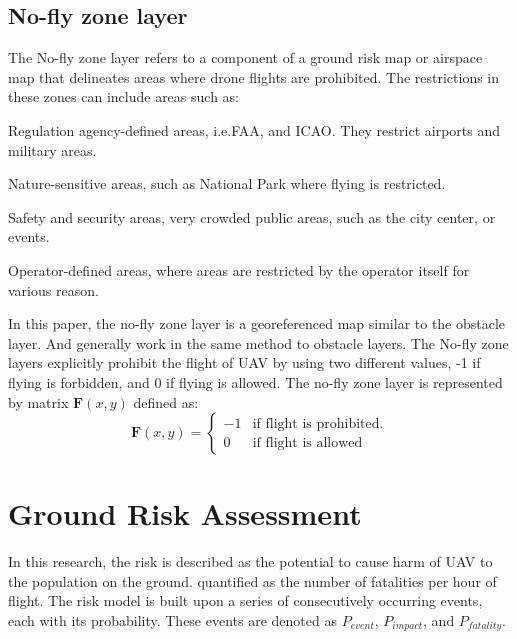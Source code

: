 \documentclass[12pt]{report}
\begin{document}
        \subsection{No-fly zone layer}
            The No-fly zone layer refers to a component of a ground risk map or airspace map that delineates areas where
            drone flights are prohibited. The restrictions in these zones can include areas such as:
            \begin{myitemize}
                \item Regulation agency-defined areas, i.e.\ac{FAA}, and \ac{ICAO}. They restrict airports and military areas.
                \item Nature-sensitive areas, such as National Park where flying is restricted.
                \item Safety and security areas, very crowded public areas, such as the city center, or events.
                \item Operator-defined areas, where areas are restricted by the operator itself for various reason. 
            \end{myitemize}

            In this paper, the no-fly zone layer is a georeferenced map similar to the obstacle layer. And generally
            work in the same method to obstacle layers. The No-fly zone layers explicitly prohibit the flight of UAV by
            using two different values, -1 if flying is forbidden, and 0 if flying is allowed. The no-fly zone layer is
            represented by matrix \(\mathbf{F}(x, y)\) defined as:
            \begin{equation}
                \mathbf{F}(x, y) = 
                \begin{cases}    
                    -1 & \text{if flight is prohibited.} \\
                    0 & \text{if flight is allowed}
                \end{cases}
            \end{equation}

    \section{Ground Risk Assessment}
        In this research, the risk is described as the potential to cause harm of UAV to the population on the ground.
        quantified as the number of fatalities per hour of flight. The risk model is built upon a series of
        consecutively occurring events, each with its probability. These events are denoted as \(P_{event}\),
        \(P_{impact}\), and \(P_{fatality}\).
\end{document}
